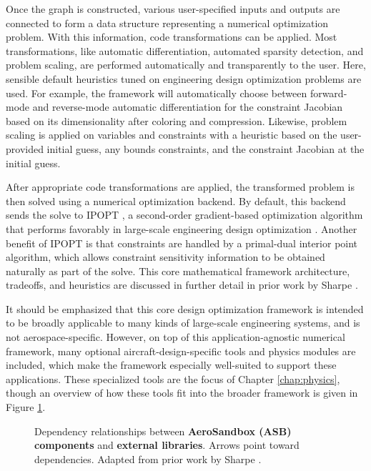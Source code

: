 Once the graph is constructed, various user-specified inputs and outputs are connected to form a data structure representing a numerical optimization problem. With this information, code transformations can be applied. Most transformations, like automatic differentiation, automated sparsity detection, and problem scaling, are performed automatically and transparently to the user. Here, sensible default heuristics tuned on engineering design optimization problems are used. For example, the framework will automatically choose between forward-mode and reverse-mode automatic differentiation for the constraint Jacobian based on its dimensionality after coloring and compression. Likewise, problem scaling is applied on variables and constraints with a heuristic based on the user-provided initial guess, any bounds constraints, and the constraint Jacobian at the initial guess.

After appropriate code transformations are applied, the transformed problem is then solved using a numerical optimization backend. By default, this backend sends the solve to IPOPT \cite{wachter_implementation_2006}, a second-order gradient-based optimization algorithm that performs favorably in large-scale engineering design optimization \cite{lyu_benchmarking_2014}. Another benefit of IPOPT is that constraints are handled by a primal-dual interior point algorithm, which allows constraint sensitivity information to be obtained naturally as part of the solve. This core mathematical framework architecture, tradeoffs, and heuristics are discussed in further detail in prior work by Sharpe \cite{sharpe_aerosandbox_2021}.

It should be emphasized that this core design optimization framework is intended to be broadly applicable to many kinds of large-scale engineering systems, and is not aerospace-specific. However, on top of this application-agnostic numerical framework, many optional aircraft-design-specific tools and physics modules are included, which make the framework especially well-suited to support these applications. These specialized tools are the focus of Chapter \ref{chap:physics}, though an overview of how these tools fit into the broader framework is given in Figure \ref{fig:asb-diagram}.

\begin{figure}[h]
    \centering
    
    \caption{Dependency relationships between \textbf{\textcolor{c1!80!black}{AeroSandbox (ASB) components}} and \textbf{\textcolor{c2!80!black}{external libraries}}. Arrows point toward dependencies. Adapted from prior work by Sharpe \cite{sharpe_aerosandbox_2021}.}
    \label{fig:asb-diagram}
\end{figure}


